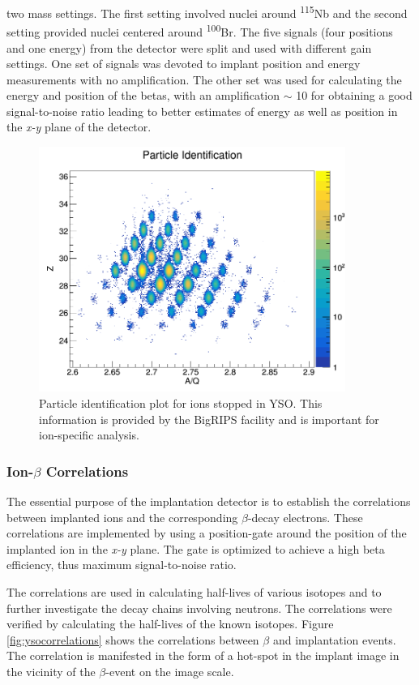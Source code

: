\documentclass[a4paper,12pt,twoside]{report}
\begin{document}
two mass settings. The first setting involved nuclei around \textsuperscript{115}Nb and the second setting provided nuclei centered around \textsuperscript{100}Br. 
The five signals (four positions and one energy) from the detector were split and used with different gain settings. One set of signals was devoted to implant position and energy measurements with no amplification. The other set was used for calculating the energy and position of the betas, with an amplification $\sim$ 10 for obtaining a good signal-to-noise ratio leading to better estimates of energy as well as position in the \textit{x-y} plane of the detector.


\begin{figure}[h!]
    \centering
    \includegraphics[width=10cm, height=8cm]{yso_pid_2.png}
    \caption[Particle identification plot for ions stopped in YSO]{Particle identification plot for ions stopped in YSO. This information is provided by the BigRIPS facility and is important for ion-specific analysis.}
    \label{fig:particleidentification}
\end{figure}

\subsubsection{Ion-$\beta$ Correlations}
The essential purpose of the implantation detector is to establish the correlations between implanted ions and the corresponding $\beta$-decay electrons. These correlations are implemented by using a position-gate around the position of the implanted ion in the \textit{x-y} plane. The gate is optimized to achieve a high beta efficiency, thus maximum signal-to-noise ratio. 

The correlations are used in calculating half-lives of various isotopes and to further investigate the decay chains involving neutrons. The correlations were verified by calculating the half-lives of the known isotopes. Figure \ref{fig:ysocorrelations} shows the correlations between $\beta$ and implantation events. The correlation is manifested in the form of a hot-spot in the implant image in the vicinity of the $\beta$-event on the image scale. 
\end{document}
